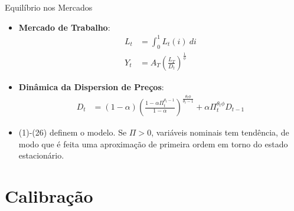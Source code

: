 \documentclass{beamer}
\begin{document}
\begin{frame}{Equilíbrio nos Mercados}
    \begin{itemize}
        \item \textbf{Mercado de Trabalho}:
        \begin{align*}
            L_t &= \int^1_0 L_t(i) ~di\\
            Y_t &= A_T \left(\frac{L_T}{D_t}\right)^\frac{1}{\phi} \tag{25}
        \end{align*}
        \item \textbf{Dinâmica da Dispersion de Preços}:
        \begin{align*}
            D_t &= (1-\alpha)\left(\frac{1 - \alpha\Pi_t^{\theta_t-1}}{1-\alpha}\right)^{\frac{\theta_t\phi}{\theta_t-1}} + \alpha \Pi_{t}^{\theta_{t}\phi}D_{t-1} \tag{26}
        \end{align*}
        \item (1)-(26) definem o modelo. Se $\Pi > 0$, variáveis nominais tem tendência, de modo que é feita uma aproximação de primeira ordem em torno do estado estacionário.
    \end{itemize}
\end{frame}





























\section{Calibração}
\end{document}

